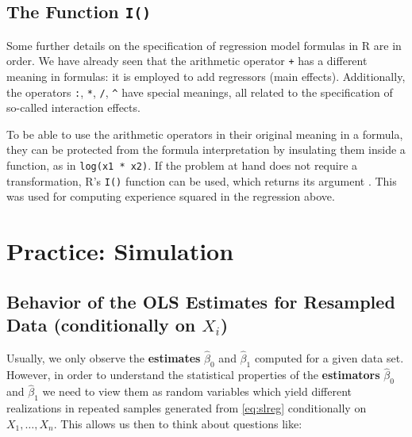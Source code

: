 \documentclass[
  14pt,
]{memoir}
\begin{document}
\hypertarget{the-function}{%
\subsection*{\texorpdfstring{The Function \texttt{I()}}{The Function }}\label{the-function}}

Some further details on the specification of regression model formulas in \textsf{R} are in order. We have already seen that the arithmetic operator \texttt{+} has a different meaning in formulas: it is employed to add regressors (main effects). Additionally, the operators \texttt{:}, \texttt{*}, \texttt{/}, \texttt{\^{}} have special meanings, all related to the specification of so-called interaction effects.

To be able to use the arithmetic operators in their original meaning in a
formula, they can be protected from the formula interpretation by insulating them inside a function, as in \texttt{log(x1\ *\ x2)}. If the problem at hand does not require a transformation, \textsf{R}'s \texttt{I()} function can be used, which returns its argument . This was used for computing experience squared in the
regression above.

\hypertarget{practice-simulation}{%
\section{Practice: Simulation}\label{practice-simulation}}

\hypertarget{behavior-of-the-ols-estimates-for-resampled-data-conditionally-on-x_i}{%
\subsection{\texorpdfstring{Behavior of the OLS Estimates for Resampled Data (conditionally on \(X_i\))}{Behavior of the OLS Estimates for Resampled Data (conditionally on X\_i)}}\label{behavior-of-the-ols-estimates-for-resampled-data-conditionally-on-x_i}}

Usually, we only observe the \textbf{estimates} \(\hat{\beta}_0\) and \(\hat{\beta}_1\) computed for a given data set. However, in order to understand the statistical properties of the \textbf{estimators} \(\hat{\beta}_0\) and \(\hat{\beta}_1\) we need to view them as random variables which yield different realizations in repeated samples generated from \eqref{eq:slreg} conditionally on \(X_1,\dots,X_n\). This allows us then to think about questions like:
\end{document}
